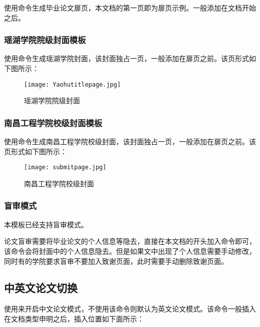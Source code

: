 \documentclass{nitthesis}
\begin{document}
使用命令生成毕业论文扉页，本文档的第一页即为扉页示例。一般添加在文档开始之后。

\subsubsection{瑶湖学院院级封面模板}

使用命令生成瑶湖学院封面，该封面独占一页，一般添加在扉页之前。该页形式如下图所示：

\begin{figure}[H]
    \begin{center}
        \texttt{[image: Yaohutitlepage.jpg]}
        \caption{瑶湖学院院级封面}
    \end{center}
\end{figure}

\subsubsection{南昌工程学院校级封面模板}

使用命令生成南昌工程学院校级封面，该封面独占一页，一般添加在扉页之前。该页形式如下图所示：

\begin{figure}[H]
    \begin{center}
        \texttt{[image: submitpage.jpg]}
        \caption{南昌工程学院校级封面}
    \end{center}
\end{figure}

\subsubsection{盲审模式}

本模板已经支持盲审模式。

论文盲审需要将毕业论文的个人信息等隐去，直接在本文档的开头加入命令即可，该命令会将封面中的个人信息隐去。但是如果文中出现了个人信息需要手动修改，同时有的学院要求盲审不要加入致谢页面，此时需要手动删除致谢页面。

\subsection{中英文论文切换}

使用来开启中文论文模式，不使用该命令则默认为英文论文模式。该命令一般插入在文档类型申明之后，插入位置如下面所示：
\end{document}
